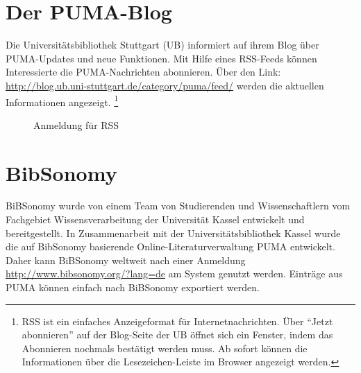 \section{Der PUMA-Blog}
\label{sec:pumaBlog}
Die Universitätsbibliothek Stuttgart (UB) informiert auf ihrem Blog über PUMA-Updates und neue Funktionen. Mit Hilfe eines RSS-Feeds können Interessierte die PUMA-Nachrichten abonnieren. Über den Link: \newline \url{http://blog.ub.uni-stuttgart.de/category/puma/feed/} werden die aktuellen Informationen angezeigt. \footnote{RSS ist ein einfaches Anzeigeformat für Internetnachrichten. Über \enquote{Jetzt abonnieren} auf der Blog-Seite der UB öffnet sich ein Fenster, indem das Abonnieren nochmals bestätigt werden muss. Ab sofort können die Informationen über die Lesezeichen-Leiste im Browser angezeigt werden.}
 \begin{figure}[h!]
 \centering
 \caption{Anmeldung für RSS}
 \label{fig:anmeldungRss}
\end{figure} 
\section{BibSonomy}
\label{sec:bibsonomy}
BiBSonomy wurde von einem Team von Studierenden und Wissenschaftlern vom Fachgebiet Wissensverarbeitung der Universität Kassel entwickelt und bereitgestellt. In Zusammenarbeit mit der Universitätsbibliothek Kassel wurde die auf BibSonomy basierende Online-Literaturverwaltung PUMA entwickelt. Daher kann BiBSonomy weltweit nach einer Anmeldung \newline \url{http://www.bibsonomy.org/?lang=de} am System genutzt werden. Einträge aus PUMA können einfach nach BiBSonomy exportiert werden.

